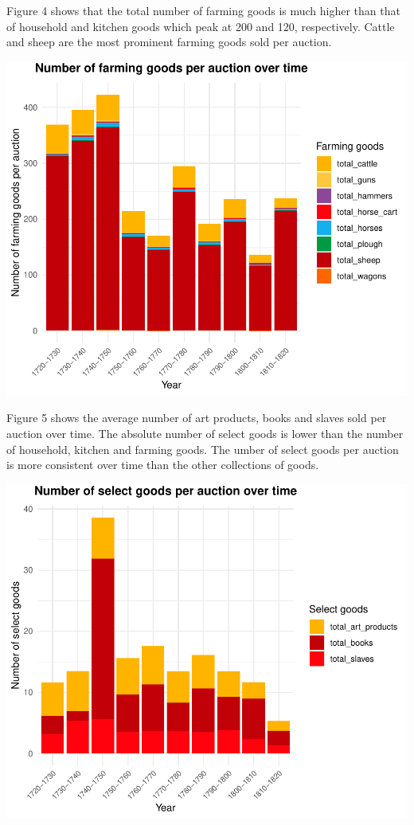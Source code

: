 \documentclass[11pt,preprint, authoryear]{elsarticle}
\numberwithin{equation}{section}
\numberwithin{figure}{section}
\numberwithin{table}{section}
\begin{document}
Figure 4 shows that the total number of farming goods is much higher
than that of household and kitchen goods which peak at 200 and 120,
respectively. Cattle and sheep are the most prominent farming goods sold
per auction.

\begin{center}\includegraphics{Project_write_up_files/figure-latex/Figure4-1} \end{center}

Figure 5 shows the average number of art products, books and slaves sold
per auction over time. The absolute number of select goods is lower than
the number of household, kitchen and farming goods. The umber of select
goods per auction is more consistent over time than the other
collections of goods.

\begin{center}\includegraphics{Project_write_up_files/figure-latex/Figure5-1} \end{center}
\end{document}

